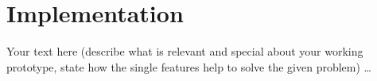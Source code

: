 \chapter{Implementation}\label{chap:implementation}
\chapterstart

Your text here (describe what is relevant and special about your working prototype, state how the single features help to solve the given problem) \ldots




\chapterend